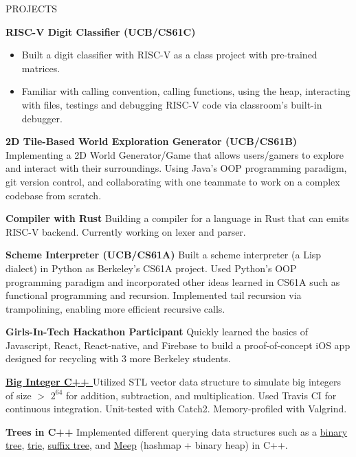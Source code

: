 \begin{rSection}{PROJECTS}
\vspace{-1.25em}

\item \textbf{RISC-V Digit Classifier (UCB/CS61C)} 
\begin{itemize}
    \item Built a digit classifier with RISC-V as a class project with pre-trained matrices. 
    \item Familiar with calling convention, calling functions, using the heap, interacting with files, testings and debugging RISC-V code via classroom's built-in debugger.
\end{itemize}


\item \textbf{2D Tile-Based World Exploration Generator (UCB/CS61B)} Implementing a 2D World Generator/Game that allows users/gamers to explore and interact with their surroundings. Using Java's OOP programming paradigm, git version control, and collaborating with one teammate to work on a complex codebase from scratch.

\item \textbf{Compiler with Rust} Building a compiler for a language in Rust that can emits RISC-V backend. Currently working on lexer and parser.

\item \textbf{Scheme Interpreter (UCB/CS61A)} { Built a scheme interpreter (a Lisp dialect) in Python as Berkeley's CS61A project. Used Python's OOP programming paradigm and incorporated other ideas learned in CS61A such as functional programming and recursion. Implemented tail recursion via trampolining, enabling more efficient recursive calls.
}

\item \textbf{Girls-In-Tech Hackathon Participant } Quickly learned the basics of Javascript, React, React-native, and Firebase to build a proof-of-concept iOS app designed for recycling with 3 more Berkeley students. 

\item \textbf{\href{https://github.com/badumbatish/BigInt}{Big Integer C++ }} {Utilized STL vector data structure to simulate big integers of size $>$ $2^{64}$ for addition, subtraction, and multiplication. Used Travis CI for continuous integration. Unit-tested with Catch2. Memory-profiled with Valgrind.}


\item \textbf{Trees in C++ } Implemented different querying data structures such as a \href{https://github.com/badumbatish/suffix_tree}{binary tree}, \href{https://github.com/badumbatish/trie}{trie}, \href{https://github.com/badumbatish/suffix_tree}{suffix tree}, and \href{https://github.com/badumbatish/Meep}{Meep} (hashmap + binary heap) in C++.



\end{rSection} 